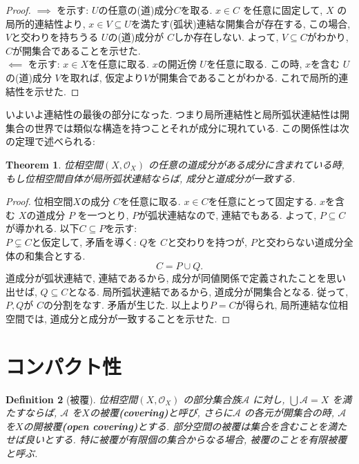 \documentclass[lualatex]{ltjsbook}
\newtheorem{theorem}{Theorem}[section]
\newtheorem{definition}[theorem]{Definition}
\theoremstyle{remark}
\theoremstyle{plain}
\begin{document}
\begin{proof}
	$\implies$ を示す:
	$U$の任意の(道)成分$C$を取る. $x \in C$ を任意に固定して, 
	$X$ の局所的連結性より, $x \in V \subseteq U$を満たす(弧状)連結な開集合が存在する, 
	この場合, $V$と交わりを持ちうる $U$の(道)成分が $C$しか存在しない. 
	よって,  $V \subseteq C$がわかり, $C$が開集合であることを示せた.\\
	$ \impliedby$ を示す: 
	 $x \in  X$を任意に取る. $x$の開近傍 $U$を任意に取る.
	 この時, $x$を含む $U$の(道)成分 $V$を取れば,
	 仮定より$V$が開集合であることがわかる. これで局所的連結性を示せた.
\end{proof}

いよいよ連結性の最後の部分になった. つまり局所連結性と局所弧状連結性は開集合の世界では類似な構造を持つことそれが成分に現れている. この関係性は次の定理で述べられる: 

\begin{theorem}
	位相空間$\left( X , \mathcal{O}_{X} \right)$ の任意の道成分がある成分に含まれている時, 
	もし位相空間自体が局所弧状連結ならば, 成分と道成分が一致する.
\end{theorem}

\begin{proof}
	位相空間$X$の成分 $C$を任意に取る. 
	$x \in C $を任意にとって固定する. 
	$x$を含む $X$の道成分 $P$ を一つとり, $P$が弧状連結なので, 連結でもある.
	よって,  $P \subseteq C$が導かれる. 以下$C \subseteq P$を示す: \\
	$P \subsetneq C $と仮定して, 矛盾を導く:
	$Q$を $C$と交わりを持つが,  $P$と交わらない道成分全体の和集合とする. 
	 \[
	C=P \cup Q
	.\]
	道成分が弧状連結で, 連結であるから, 成分が同値関係で定義されたことを思い出せば, $Q\subseteq C$となる.
	局所弧状連結であるから, 道成分が開集合となる. 従って,  $P,Q$が $C$の分割をなす. 矛盾が生じた.
	以上より$P=C$が得られ, 局所連結な位相空間では, 道成分と成分が一致することを示せた. 
\end{proof}

\section{コンパクト性}

\begin{definition}[被覆]
	位相空間$\left( X , \mathcal{O}_{X} \right)$ の部分集合族$\mathcal{A}$ に対し, $ \bigcup \mathcal{A} = X$ を満たすならば, $\mathcal{A}$ を$X$の被覆\textbf{(covering)}と呼び,  さらに$\mathcal{A}$ の各元が開集合の時, $\mathcal{A}$ を$X$の開被覆\textbf{(open covering)}とする. 部分空間の被覆は集合を含むことを満たせば良いとする. 特に被覆が有限個の集合からなる場合, 被覆のことを有限被覆と呼ぶ.
\end{definition}
\end{document}
